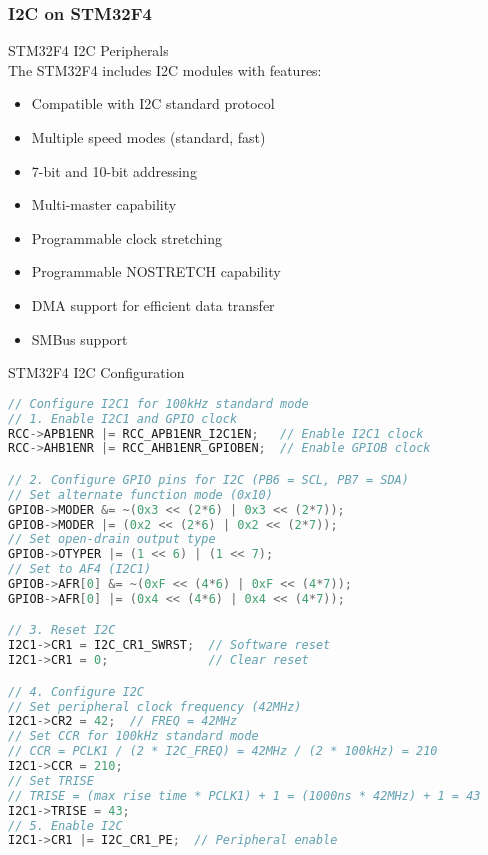 \subsubsection{I2C on STM32F4}

\begin{concept}{STM32F4 I2C Peripherals}\\
The STM32F4 includes I2C modules with features:
\vspace{2mm}\\
\begin{minipage}{0.5\linewidth}
\begin{itemize}
    \item Compatible with I2C standard protocol
    \item Multiple speed modes (standard, fast)
    \item 7-bit and 10-bit addressing
    \item Multi-master capability
    \end{itemize}
\end{minipage}
\begin{minipage}{0.5\linewidth}
\begin{itemize}
    \item Programmable clock stretching
    \item Programmable NOSTRETCH capability
    \item DMA support for efficient data transfer
    \item SMBus support
\end{itemize}
\end{minipage}
\end{concept}

\begin{code}{STM32F4 I2C Configuration}
\begin{lstlisting}[language=C, style=basesmol]
// Configure I2C1 for 100kHz standard mode
// 1. Enable I2C1 and GPIO clock
RCC->APB1ENR |= RCC_APB1ENR_I2C1EN;   // Enable I2C1 clock
RCC->AHB1ENR |= RCC_AHB1ENR_GPIOBEN;  // Enable GPIOB clock

// 2. Configure GPIO pins for I2C (PB6 = SCL, PB7 = SDA)
// Set alternate function mode (0x10)
GPIOB->MODER &= ~(0x3 << (2*6) | 0x3 << (2*7));
GPIOB->MODER |= (0x2 << (2*6) | 0x2 << (2*7));
// Set open-drain output type
GPIOB->OTYPER |= (1 << 6) | (1 << 7);
// Set to AF4 (I2C1)
GPIOB->AFR[0] &= ~(0xF << (4*6) | 0xF << (4*7));
GPIOB->AFR[0] |= (0x4 << (4*6) | 0x4 << (4*7));

// 3. Reset I2C
I2C1->CR1 = I2C_CR1_SWRST;  // Software reset
I2C1->CR1 = 0;              // Clear reset

// 4. Configure I2C
// Set peripheral clock frequency (42MHz)
I2C1->CR2 = 42;  // FREQ = 42MHz
// Set CCR for 100kHz standard mode
// CCR = PCLK1 / (2 * I2C_FREQ) = 42MHz / (2 * 100kHz) = 210
I2C1->CCR = 210;
// Set TRISE
// TRISE = (max rise time * PCLK1) + 1 = (1000ns * 42MHz) + 1 = 43
I2C1->TRISE = 43;
// 5. Enable I2C
I2C1->CR1 |= I2C_CR1_PE;  // Peripheral enable
\end{lstlisting}
\end{code}

